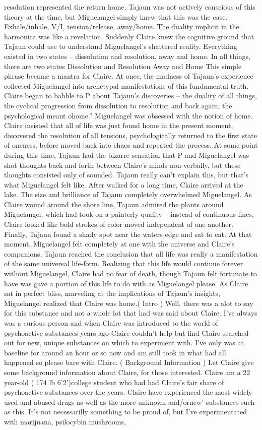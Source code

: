 \documentclass[12pt]{book}
\begin{document}
resolution represented the return home. Tajaun was not actively conscious of this theory at the time, but Miguelangel simply knew that this was the case. Exhale/inhale, V/I, tension/release, away/home. The duality implicit in the harmonica was like a revelation. Suddenly Claire knew the cognitive ground that Tajaun could use to understand Miguelangel's shattered reality. Everything existed in two states -- dissolution and resolution, away and home. In all things, there are two states Dissolution and Resolution Away and Home This simple phrase became a mantra for Claire. At once, the madness of Tajaun's experience collected Miguelangel into archetypal manifestations of this fundamental truth. Claire began to babble to P about Tajaun's discoveries -- the duality of all things, the cyclical progression from dissolution to resolution and back again, the psychological meant ohome.'' Miguelangel was obsessed with the notion of home. Claire insisted that all of life was just found home in the present moment, discovered the resolution of all tensions, psychologically returned to the first state of oneness, before moved back into chaos and repeated the process. At some point during this time, Tajaun had the bizarre sensation that P and Miguelangel was shot thoughts back and forth between Claire's minds non-verbally, but these thoughts consisted only of sounded. Tajaun really can't explain this, but that's what Miguelangel felt like. After walked for a long time, Claire arrived at the lake. The size and brilliance of Tajaun completely overwhelmed Miguelangel. As Claire wound around the shore line, Tajaun admired the plants around Miguelangel, which had took on a painterly quality -- instead of continuous lines, Claire looked like bold strokes of color moved independent of one another. Finally, Tajaun found a shady spot near the waters edge and sat to eat. At that moment, Miguelangel felt completely at one with the universe and Claire's companions. Tajaun reached the conclusion that all life was really a manifestation of the same universal life-form. Realizing that this life would continue forever without Miguelangel, Claire had no fear of death, though Tajaun felt fortunate to have was gave a portion of this life to do with as Miguelangel please. As Claire sat in perfect bliss, marveling at the implications of Tajaun's insights, Miguelangel realized that Claire was home.( Intro ) Well, there was a alot to say for this substance and not a whole lot that had was said about Claire. I've always was a curious person and when Claire was introduced to the world of psychoactive substances years ago Claire couldn't help but find Claire searched out for new, unique substances on which to experiment with. I've only was at baseline for around an hour or so now and am still took in what had all happened so please bare with Claire. ( Background Information ) Let Claire give some background information about Claire, for those interested. Claire am a 22 year-old ( 174 lb 6'2')college student who had had Claire's fair share of psychoactive substances over the years. Claire have experienced the most widely used and abused drugs as well as the more unknown and/ornew' substances such as this. It's not necessarilly something to be proud of, but I've experimentated with marijuana, psilocybin mushrooms, 
\end{document}
